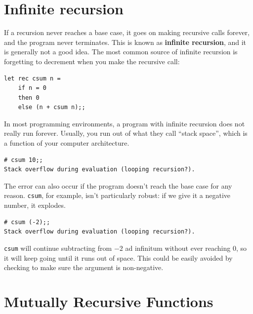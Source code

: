 \documentclass[10pt]{book}
\begin{document}

\section{Infinite recursion}

If a recursion never reaches a base case, it goes on making
recursive calls forever, and the program never terminates.  This is
known as {\bf infinite recursion}, and it is generally not
a good idea.  The most common source of infinite recursion
is forgetting to decrement when you make the recursive call:

\beforeverb
\begin{verbatim}
let rec csum n = 
	if n = 0
	then 0
	else (n + csum n);;
\end{verbatim}
\afterverb
%
In most programming environments, a program with infinite recursion
does not really run forever. Usually, you run out of what they call
``stack space'', which is a function of your computer architecture.


\beforeverb
\begin{verbatim}
# csum 10;;
Stack overflow during evaluation (looping recursion?).
\end{verbatim}
\afterverb

The error can also occur if the program doesn't reach the base case
for any reason. {\tt csum}, for example, isn't particularly robust:
if we give it a negative number, it explodes.

\beforeverb
\begin{verbatim}
# csum (-2);;
Stack overflow during evaluation (looping recursion?).
\end{verbatim}
\afterverb

{\tt csum} will continue subtracting from $-2$ ad infinitum without 
ever reaching 0, so it will keep going until it runs out of space.
This could be easily avoided by checking to make sure the argument 
is non-negative.

\section{Mutually Recursive Functions}
\end{document}
